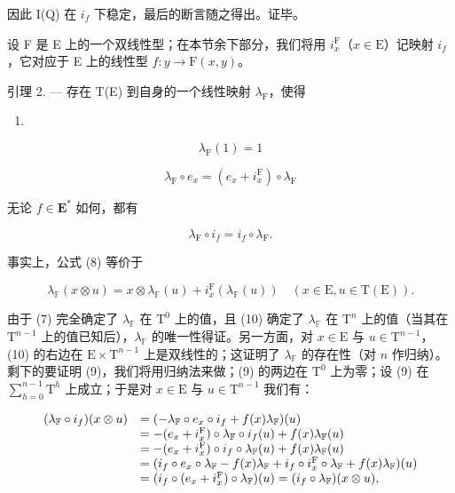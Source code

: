   因此 I(Q) 在 \(i_{f}\) 下稳定，最后的断言随之得出。证毕。

  设 F 是 E 上的一个双线性型；在本节余下部分，我们将用 \(i_x^{\mathrm{F}}\)（\(x \in \mathrm{E}\)）记映射 \(i_f\)，它对应于 E 上的线性型 \(f: y \to \mathrm{F}(x, y)\)。

引理 2. --- 存在 T(E) 到自身的一个线性映射 \(\lambda_{\mathrm{F}}\)，使得

\begin{enumerate}
\def\labelenumi{(\arabic{enumi})}
\setcounter{enumi}{6}
\tightlist
\item
\end{enumerate}

\[
\lambda_ {\mathrm{F}} (1) = 1\tag{8}
\]

\[
\lambda_ {\mathrm{F}} \circ e _ {x} = (e _ {x} + i _ {x} ^ {\mathrm{F}}) \circ \lambda_ {\mathrm{F}}\tag{\( (x \in E) \) .}
\]

  无论 \(f \in \mathbf{E}^*\) 如何，都有

\[
\lambda_ {\mathrm{F}} \circ i _ {f} = i _ {f} \circ \lambda_ {\mathrm{F}}.\tag{9}
\]

  事实上，公式 (8) 等价于

\[
\lambda_ {\mathbb {F}} (x \otimes u) = x \otimes \lambda_ {\mathbb {F}} (u) + i _ {x} ^ {\mathrm{F}} (\lambda_ {\mathbb {F}} (u)) \quad (x \in \mathrm{E}, u \in \mathrm{T} (\mathrm{E})).\tag{10}
\]

  由于 (7) 完全确定了 \(\lambda_{\mathbb{F}}\) 在 \(\mathrm{T}^{0}\) 上的值，且 (10) 确定了 \(\lambda_{\mathbb{F}}\) 在 \(\mathrm{T}^{n}\) 上的值（当其在 \(\mathrm{T}^{n-1}\) 上的值已知后），\(\lambda_{\mathbb{F}}\) 的唯一性得证。另一方面，对 \(x \in \mathrm{E}\) 与 \(u \in \mathrm{T}^{n-1}\)，(10) 的右边在 \(\mathrm{E} \times \mathrm{T}^{n-1}\) 上是双线性的；这证明了 \(\lambda_{\mathbb{F}}\) 的存在性（对 \(n\) 作归纳）。剩下的要证明 (9)，我们将用归纳法来做；(9) 的两边在 \(\mathrm{T}^{0}\) 上为零；设 (9) 在 \(\sum_{h=0}^{n-1} \mathrm{T}^{h}\) 上成立；于是对 \(x \in \mathrm{E}\) 与 \(u \in \mathrm{T}^{n-1}\) 我们有：

\[
\begin{array}{r l} (\lambda_ {\mathbb {F}} \circ i _ {f}) (x \otimes u) & = (- \lambda_ {\mathbb {F}} \circ e _ {x} \circ i _ {f} + f (x) \lambda_ {\mathbb {F}}) (u) \\ & = - (e _ {x} + i _ {x} ^ {\mathrm{F}}) \circ \lambda_ {\mathbb {F}} \circ i _ {f} (u) + f (x) \lambda_ {\mathbb {F}} (u) \\ & = - (e _ {x} + i _ {x} ^ {\mathrm{F}}) \circ i _ {f} \circ \lambda_ {\mathbb {F}} (u) + f (x) \lambda_ {\mathbb {F}} (u) \\ & = (i _ {f} \circ e _ {x} \circ \lambda_ {\mathbb {F}} - f (x) \lambda_ {\mathbb {F}} + i _ {f} \circ i _ {x} ^ {\mathrm{F}} \circ \lambda_ {\mathbb {F}} + f (x) \lambda_ {\mathbb {F}}) (u) \\ & = (i _ {f} \circ (e _ {x} + i _ {x} ^ {\mathrm{F}}) \circ \lambda_ {\mathbb {F}}) (u) = (i _ {f} \circ \lambda_ {\mathbb {F}}) (x \otimes u), \end{array}
\]

